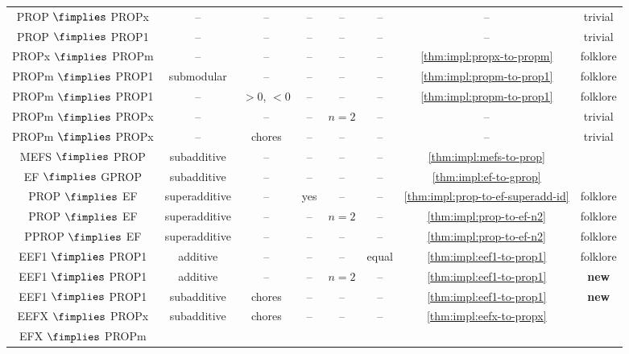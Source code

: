 \begin{longtable}{cccccccc}
%
\\[\defaultaddspace] PROP $\fimplies$ PROPx
    & -- & -- & -- & -- & -- & -- & trivial
\\[\defaultaddspace] PROP $\fimplies$ PROP1
    & -- & -- & -- & -- & -- & -- & trivial
\\[\defaultaddspace] PROPx $\fimplies$ PROPm
    & -- & -- & -- & -- & -- & \cref{thm:impl:propx-to-propm} & folklore
\\[\defaultaddspace] PROPm $\fimplies$ PROP1
    & submodular & -- & -- & -- & -- & \cref{thm:impl:propm-to-prop1} & folklore
\\[\defaultaddspace] PROPm $\fimplies$ PROP1
    & -- & $> 0$, $< 0$ & -- & -- & -- & \cref{thm:impl:propm-to-prop1} & folklore
\\[\defaultaddspace] PROPm $\fimplies$ PROPx
    & -- & -- & -- & $n=2$ & -- & -- & trivial
\\[\defaultaddspace] PROPm $\fimplies$ PROPx
    & -- & chores & -- & -- & -- & -- & trivial
%
\\ \midrule MEFS $\fimplies$ PROP
    & subadditive & -- & -- & -- & -- & \cref{thm:impl:mefs-to-prop} & \cite{bouveret2016characterizing}
\\[\defaultaddspace] EF $\fimplies$ GPROP
    & subadditive & -- & -- & -- & -- & \cref{thm:impl:ef-to-gprop} & \cite{bouveret2016characterizing}
\\[\defaultaddspace] PROP $\fimplies$ EF
    & superadditive & -- & yes & -- & -- & \cref{thm:impl:prop-to-ef-superadd-id} & folklore
\\[\defaultaddspace] PROP $\fimplies$ EF
    & superadditive & -- & -- & $n=2$ & -- & \cref{thm:impl:prop-to-ef-n2} & folklore
\\[\defaultaddspace] PPROP $\fimplies$ EF
    & superadditive & -- & -- & -- & -- & \cref{thm:impl:prop-to-ef-n2} & folklore
%
\\\midrule EEF1 $\fimplies$ PROP1
    & additive & -- & -- & -- & equal & \cref{thm:impl:eef1-to-prop1} & folklore
\\[\defaultaddspace] EEF1 $\fimplies$ PROP1
    & additive & -- & -- & $n=2$ & -- & \cref{thm:impl:eef1-to-prop1} & \textbf{new}
\\[\defaultaddspace] EEF1 $\fimplies$ PROP1
    & subadditive & chores & -- & -- & -- & \cref{thm:impl:eef1-to-prop1} & \textbf{new}
\\[\defaultaddspace] EEFX $\fimplies$ PROPx
    & subadditive & chores & -- & -- & -- & \cref{thm:impl:eefx-to-propx} & \cite{li2022almost}
\\[\defaultaddspace] EFX $\fimplies$ PROPm

\end{longtable}
